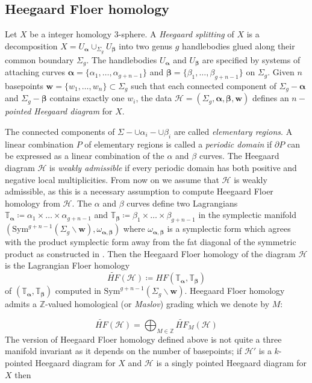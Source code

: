 \documentclass[11pt]{amsart}
\theoremstyle{definition}
\theoremstyle{remark}
\def\Z{\mathbb{Z}}
\def\talpha{\mathbb{T}_{\bm{\alpha}}}
\def\tbeta{\mathbb{T}_{\bm{\beta}}}
\def\Sym{\mathrm{Sym}}
\numberwithin{equation}{section}
\begin{document}
\subsection{Heegaard Floer homology}\label{heegaard}
Let $X$ be a integer homology $3$-sphere.
 A \emph{Heegaard splitting} of $X$ is a decomposition $X=U_{\bm{\alpha}}\cup_{\Sigma_g}U_{\bm{\beta}}$ into two genus $g$ handlebodies glued along their common boundary $\Sigma_g$. The handlebodies $U_{\bm{\alpha}}$ and $U_{\bm{\beta}}$ are specified by systems of attaching curves $\bm{\alpha}=\{\alpha_1,\hdots,\alpha_{g+n-1}\}$ and $\bm{\beta}=\{\beta_1,\hdots,\beta_{g+n-1}\}$ on $\Sigma_g$. Given $n$ basepoints $\bm{w}=\{w_1,\hdots,w_n\}\subset \Sigma_g$ such that each connected component of $\Sigma_g-\bm{\alpha}$ and $\Sigma_g-\bm{\beta}$ contains exactly one $w_i$, the data $\mathcal{H}=(\Sigma_g,\bm{\alpha},\bm{\beta},\bm{w})$ defines an $n-$\emph{pointed Heegaard diagram} for $X$.
 
 The connected components of $\Sigma-\cup \alpha_i-\cup \beta_i$ are called \emph{elementary regions}. A linear combination $P$ of elementary regions is called a \emph{periodic domain} if $\partial P$ can be expressed as a linear combination of the $\alpha$ and $\beta$ curves. The Heegaard diagram $\mathcal{H}$ is \emph{weakly admissible} if every periodic domain has both positive and negative local multiplicities. From now on we assume that $\mathcal{H}$ is weakly admissible, as this is a necessary assumption to compute Heegaard Floer homology from $\mathcal{H}.$
 The $\alpha$ and $\beta$ curves define two Lagrangians $\talpha\coloneq \alpha_1\times\hdots\times \alpha_{g+n-1}$ and $\tbeta\coloneq \beta_1\times\hdots\times \beta_{g+n-1}$ in the symplectic manifold $(\Sym^{g+n-1}(\Sigma_g\backslash \bm{w}),\omega_{\bm{\alpha},\bm{\beta}})$ where $\omega_{\bm{\alpha},\bm{\beta}}$ is a symplectic form which agrees with the product symplectic form away from the fat diagonal of the symmetric product as constructed in \cite{perutz}. Then the Heegaard Floer homology of the diagram $\mathcal{H}$ is the Lagrangian Floer homology \begin{equation}\widetilde{HF}(\mathcal{H})\coloneq HF(\talpha,\tbeta)\end{equation} of $(\talpha,\tbeta)$ computed in $\Sym^{g+n-1}(\Sigma_{g}\backslash \bm{w})$. Heegaard Floer homology admits a $\Z$-valued homological (or \emph{Maslov}) grading which we denote by $M$:
 
\begin{equation}
\widetilde{HF}(\mathcal{H})=\bigoplus_{M\in\Z}\widetilde{HF}_M(\mathcal{H})
\end{equation}
The version of Heegaard Floer homology defined above is not quite a three manifold invariant as it depends on the number of basepoints; if $\mathcal{H}'$ is a $k$-pointed Heegaard diagram for $X$ and $\mathcal{H}$ is a singly pointed Heegaard diagram for $X$ then 
\end{document}
